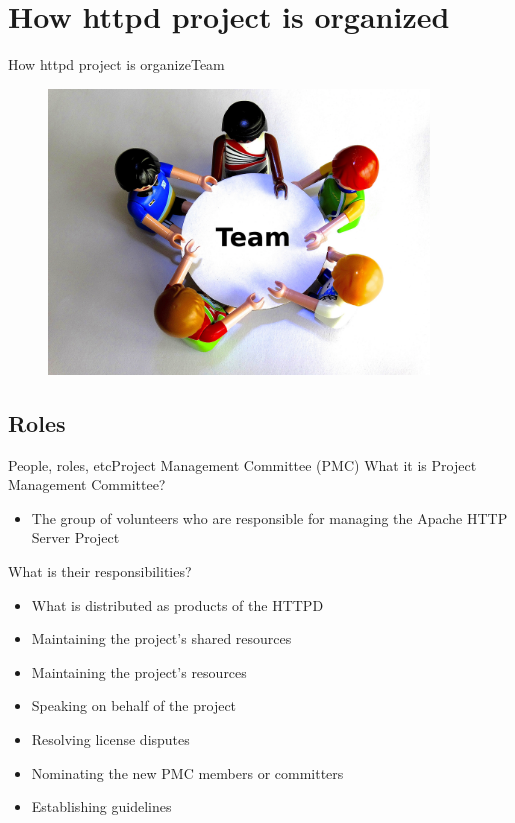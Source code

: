 \documentclass[10pt]{beamer}
\begin{document}
\section{How httpd project is organized}
\begin{frame}{How httpd project is organize}{Team}
  \begin{figure}[ht]
    \centering
    \includegraphics[width=0.9\textwidth, keepaspectratio=true]{images/roles.jpg}
  \end{figure}
\end{frame}

\subsection{Roles}
\begin{frame}{People, roles, etc}{Project Management Committee (PMC)}
  What it is Project Management Committee? \pause
  \begin{itemize}
    \item The group of volunteers who are responsible for managing the Apache
          HTTP Server Project \pause
  \end{itemize}

  What is their responsibilities? \pause
  \begin{itemize}
    \item What is distributed as products of the HTTPD \pause
    \item Maintaining the project's shared resources \pause
    \item Maintaining the project's resources \pause
    \item Speaking on behalf of the project \pause
    \item Resolving license disputes \pause
    \item Nominating the new PMC members or committers \pause
    \item Establishing guidelines
  \end{itemize}
\end{frame}
\end{document}
